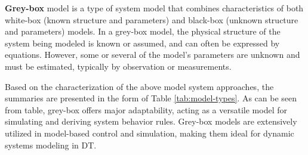 \textbf{Grey-box} model is a type of system model that combines characteristics of both white-box (known structure and parameters) and black-box (unknown structure and parameters) models. In a grey-box model, the physical structure of the system being modeled is known or assumed, and can often be expressed by equations. However, some or several of the model's parameters are unknown and must be estimated, typically by observation or measurements.

Based on the characterization of the above model system approaches, the summaries are presented in the form of Table \ref{tab:model-types}. As can be seen from table, grey-box offers major adaptability, acting as a versatile model for simulating and deriving system behavior rules. Grey-box models are extensively utilized in model-based control and simulation, making them ideal for dynamic systems modeling in DT.

